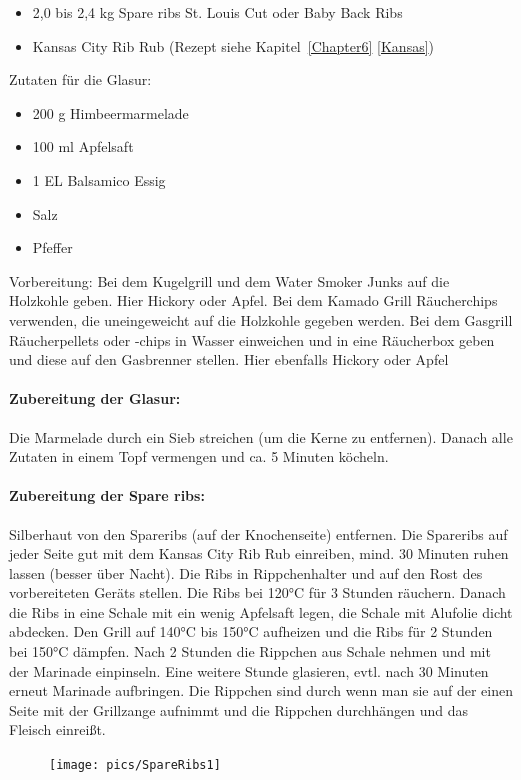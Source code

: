\begin{itemize}[noitemsep]
	\item 2,0 bis 2,4 kg Spare ribs St. Louis Cut oder Baby Back Ribs
	\item Kansas City Rib Rub (Rezept siehe Kapitel~\ref{Chapter6} 
	\vref{Kansas})
\end{itemize}

Zutaten für die Glasur:
\begin{itemize}[noitemsep]
	\item 200 g Himbeermarmelade
	\item 100 ml Apfelsaft
	\item 1 EL Balsamico Essig
	\item Salz
	\item Pfeffer	
\end{itemize}

Vorbereitung: Bei dem Kugelgrill und dem Water Smoker Junks auf die Holzkohle geben. Hier Hickory oder Apfel.
Bei dem Kamado Grill Räucherchips verwenden, die uneingeweicht auf die Holzkohle gegeben werden.
Bei dem Gasgrill Räucherpellets oder -chips in Wasser einweichen und in 
eine Räucherbox geben und diese auf den Gasbrenner stellen. Hier 
ebenfalls Hickory oder Apfel

\paragraph{Zubereitung der Glasur:}

Die Marmelade durch ein Sieb streichen (um die Kerne zu entfernen). 
Danach alle Zutaten in einem Topf vermengen und ca. 5 Minuten köcheln.

\paragraph{Zubereitung der Spare ribs:}

Silberhaut von den Spareribs (auf der Knochenseite) entfernen.
Die Spareribs auf jeder Seite gut mit dem Kansas City Rib Rub einreiben, 
mind. 30 Minuten ruhen lassen (besser über Nacht).
Die Ribs in Rippchenhalter und auf den Rost des vorbereiteten 
Geräts stellen.
Die Ribs bei 120°C für 3 Stunden räuchern. Danach die Ribs in eine 
Schale mit ein wenig Apfelsaft legen, die Schale mit Alufolie dicht 
abdecken. Den Grill auf 140°C bis 150°C aufheizen und die Ribs für 2 
Stunden bei 150°C dämpfen.
Nach 2 Stunden die Rippchen aus Schale nehmen und mit der Marinade 
einpinseln. Eine weitere Stunde glasieren, evtl. nach 30 Minuten erneut 
Marinade aufbringen.
Die Rippchen sind durch wenn man sie auf der einen Seite mit der 
Grillzange aufnimmt und die Rippchen durchhängen und das Fleisch 
einreißt. 
\newpage
\begin{figure}[htbp]
			\centering
		\begin{minipage}{1\textwidth}
		\centering
		\texttt{[image: pics/SpareRibs1]}
		\label{fig:Spare}
		\end{minipage}
\end{figure}
\newpage

